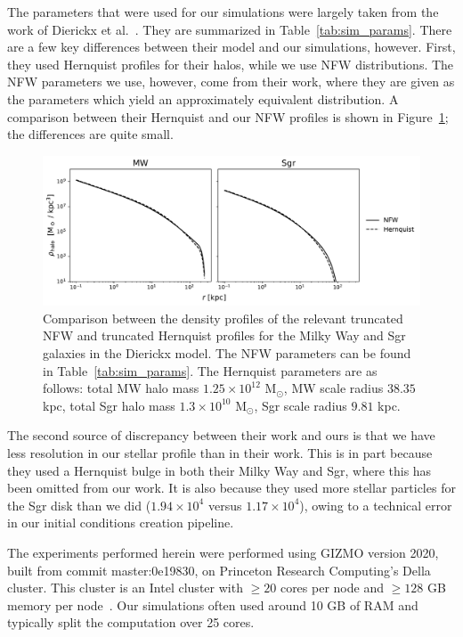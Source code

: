 The parameters that were used for our simulations were largely taken from the
work of Dierickx et al.~\cite{dierickx_predicted_2017}. They are summarized in
Table~\ref{tab:sim_params}. There are a few key differences between their model
and our simulations, however. First, they used Hernquist profiles for their
halos, while we use NFW distributions. The NFW parameters we use, however, come
from their work, where they are given as the parameters which yield an
approximately equivalent distribution. A comparison between their Hernquist
and our NFW profiles is shown in Figure~\ref{fig:nfw_vs_hernquist}; the
differences are quite small.

\begin{figure}
    \centering
    \includegraphics[width=0.9\linewidth]{figs/nfw_vs_hernquist.pdf}
    \caption{%
        Comparison between the density profiles of the relevant truncated NFW
        and truncated Hernquist profiles for the Milky Way and Sgr galaxies in
        the Dierickx model. The NFW parameters can be found in
        Table~\ref{tab:sim_params}. The Hernquist parameters are as follows:
        total MW halo mass $1.25 \times 10^{12}$ M$_\odot$, MW scale radius
        $38.35$ kpc, total Sgr halo mass $1.3 \times 10^{10}$ M$_\odot$, Sgr
        scale radius $9.81$ kpc.
    }
    \label{fig:nfw_vs_hernquist}
\end{figure}

The second source of discrepancy between their work and ours is that we have
less resolution in our stellar profile than in their work. This is in part
because they used a Hernquist bulge in both their Milky Way and Sgr, where this
has been omitted from our work. It is also because they used more stellar
particles for the Sgr disk than we did ($1.94 \times 10^4$ versus $1.17 \times
10^4$), owing to a technical error in our initial conditions creation
pipeline.

The experiments performed herein were performed using GIZMO version
2020, built from commit master:0e19830, on Princeton Research Computing's
Della cluster.  This cluster is an Intel cluster with $\geq 20$ cores per node
and $\geq 128$ GB memory per
node~\cite{princeton_research_computing_della_nodate}.  Our simulations often
used around 10 GB of RAM and typically split the computation over 25 cores.


